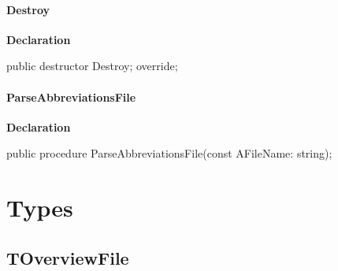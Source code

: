 \documentclass{report}
\newif\ifpdf
\begin{document}
\paragraph*{Destroy}\hspace*{\fill}

\label{PasDoc_Gen.TDocGenerator-Destroy}
\begin{list}{}{
\setlength{\itemindent}{0cm}
\setlength{\listparindent}{0cm}
\setlength{\leftmargin}{\evensidemargin}
\addtolength{\leftmargin}{\tmplength}
\settowidth{\labelsep}{X}
\addtolength{\leftmargin}{\labelsep}
\setlength{\labelwidth}{\tmplength}
}
\item[\textbf{Declaration}\hfill]
\ifpdf
\begin{flushleft}
\fi
\begin{ttfamily}
public destructor Destroy; override;\end{ttfamily}

\ifpdf
\end{flushleft}
\fi

\end{list}
\paragraph*{ParseAbbreviationsFile}\hspace*{\fill}

\label{PasDoc_Gen.TDocGenerator-ParseAbbreviationsFile}
\begin{list}{}{
\setlength{\itemindent}{0cm}
\setlength{\listparindent}{0cm}
\setlength{\leftmargin}{\evensidemargin}
\addtolength{\leftmargin}{\tmplength}
\settowidth{\labelsep}{X}
\addtolength{\leftmargin}{\labelsep}
\setlength{\labelwidth}{\tmplength}
}
\item[\textbf{Declaration}\hfill]
\ifpdf
\begin{flushleft}
\fi
\begin{ttfamily}
public procedure ParseAbbreviationsFile(const AFileName: string);\end{ttfamily}

\ifpdf
\end{flushleft}
\fi

\end{list}
\section{Types}
\ifpdf
\subsection*{\large{\textbf{TOverviewFile}}\normalsize\hspace{1ex}\hrulefill}
\else
\end{document}
